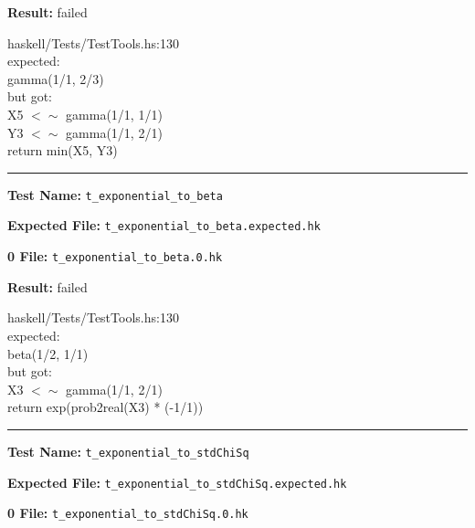 \documentclass[11pt]{article}
\begin{document}
\bigskip


\bigskip
\textbf{Result:} failed

\bigskip
\noindent


\bigskip
\noindent
haskell/Tests/TestTools.hs:130\\expected:\\gamma(1/1, 2/3)\\but got:\\X5 $<\sim$ gamma(1/1, 1/1)\\Y3 $<\sim$ gamma(1/1, 2/1)\\return min(X5, Y3)\\

\hrule

\bigskip
\textbf{Test Name:} {\tt t\_exponential\_to\_beta}

\textbf{Expected File:} {\tt t\_exponential\_to\_beta.expected.hk}

\bigskip


\bigskip
\textbf{0 File:} {\tt t\_exponential\_to\_beta.0.hk}

\bigskip


\bigskip
\textbf{Result:} failed

\bigskip
\noindent


\bigskip
\noindent
haskell/Tests/TestTools.hs:130\\expected:\\beta(1/2, 1/1)\\but got:\\X3 $<\sim$ gamma(1/1, 2/1)\\return exp(prob2real(X3) * (-1/1))\\

\hrule

\bigskip
\textbf{Test Name:} {\tt t\_exponential\_to\_stdChiSq}

\textbf{Expected File:} {\tt t\_exponential\_to\_stdChiSq.expected.hk}

\bigskip


\bigskip
\textbf{0 File:} {\tt t\_exponential\_to\_stdChiSq.0.hk}

\bigskip

\end{document}
